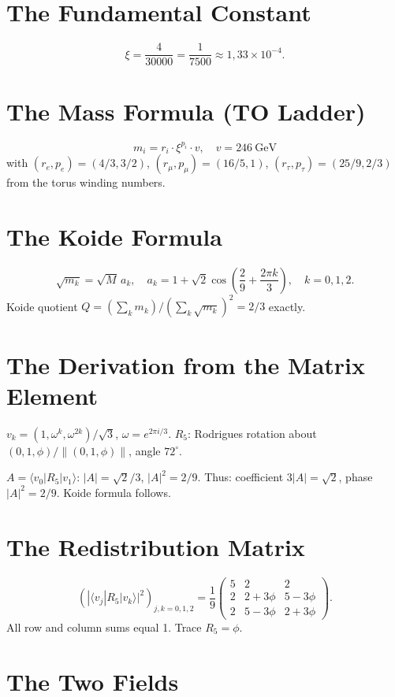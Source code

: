 \documentclass[12pt,oneside]{book}
\begin{document}
\section{The Fundamental Constant}

\[
\xi = \frac{4}{30000} = \frac{1}{7500} \approx 1{,}33 \times 10^{-4}.
\]

\section{The Mass Formula (TO Ladder)}

\[
m_i = r_i \cdot \xi^{p_i} \cdot v, \quad v = 246~\text{GeV}
\]
with $(r_e, p_e) = (4/3, 3/2)$, $(r_\mu, p_\mu) = (16/5, 1)$, $(r_\tau, p_\tau) = (25/9, 2/3)$ from the torus winding numbers.

\section{The Koide Formula}

\[
\sqrt{m_k} = \sqrt{M}\, a_k, \quad a_k = 1 + \sqrt{2} \cos\left(\frac{2}{9} + \frac{2\pi k}{3}\right), \quad k = 0, 1, 2.
\]
Koide quotient $Q = (\sum_k m_k)/(\sum_k \sqrt{m_k})^2 = 2/3$ exactly.

\section{The Derivation from the Matrix Element}

$v_k = (1, \omega^k, \omega^{2k})/\sqrt{3}$, $\omega = e^{2\pi i/3}$. $R_5$: Rodrigues rotation about $(0, 1, \phi)/\|(0, 1, \phi)\|$, angle $72^\circ$.

$A = \langle v_0 | R_5 | v_1 \rangle$: $|A| = \sqrt{2}/3$, $|A|^2 = 2/9$. Thus: coefficient $3|A| = \sqrt{2}$, phase $|A|^2 = 2/9$. Koide formula follows.

\section{The Redistribution Matrix}

\[
\left(|\langle v_j | R_5 | v_k \rangle|^2\right)_{j,k=0,1,2} = \frac{1}{9}
\begin{pmatrix}
5 & 2 & 2 \\
2 & 2+3\phi & 5-3\phi \\
2 & 5-3\phi & 2+3\phi
\end{pmatrix}.
\]
All row and column sums equal 1. Trace $R_5 = \phi$.

\section{The Two Fields}
\end{document}
